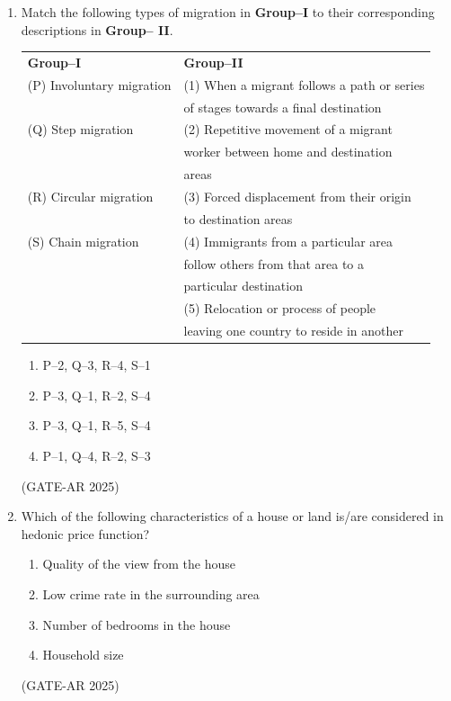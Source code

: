 \documentclass[a4paper,10pt]{article}
\begin{document}
\begin{enumerate}
\item Match the following types of migration in \textbf{Group–I} to their corresponding descriptions in \textbf{Group– II}. \\
\begin{tabular}{ l l }
\textbf{Group–I} & \textbf{Group–II} \\
(P) Involuntary migration & (1) When a migrant follows a path or series \\
& of stages towards a final destination \\
(Q) Step migration & (2) Repetitive movement of a migrant \\
& worker between home and destination \\
& areas \\
(R) Circular migration & (3) Forced displacement from their origin \\
& to destination areas \\
(S) Chain migration & (4) Immigrants from a particular area \\
& follow others from that area to a \\
& particular destination \\
& (5) Relocation or process of people \\
& leaving one country to reside in another \\
\end{tabular}
\begin{multicols}{2}
\begin{enumerate}
    \item P–2, Q–3, R–4, S–1
    \item P–3, Q–1, R–2, S–4
    \item P–3, Q–1, R–5, S–4
    \item P–1, Q–4, R–2, S–3
\end{enumerate}
\end{multicols}
\hfill (GATE-AR 2025)

\item Which of the following characteristics of a house or land is/are considered in hedonic price function?
\begin{enumerate}
    \item Quality of the view from the house
    \item Low crime rate in the surrounding area
    \item Number of bedrooms in the house
    \item Household size
\end{enumerate}
\hfill (GATE-AR 2025)


\end{enumerate}
\end{document}
